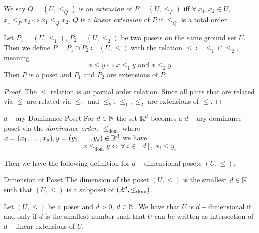 \documentclass[twoside]{article}
\newcommand{\domrel}{\ensuremath{\leq_{\text{dom}}}}
\begin{document}
We say $Q=(U,\leq_Q)$ is an \textit{extension} of $P=(U,\leq_P)$ iff $\forall\ x_1,x_2\in U$, $x_1\leq_Px_2\iff x_1\leq_Qx_2$. $Q$ is a \textit{linear extension} of $P$ if $\leq_Q$ is a total order. 
\begin{lemma}{}{}
	Let $P_1=(U,\leq _1)$, $P_2=(U,\leq_2)$ be two posets on the same ground set $U$. Then we define $P=P_1\cap P_2\coloneqq (U,\leq)$ with the relation $\leq \coloneqq \leq_1\cap \leq_2$, meaning $$x\leq y\iff x\leq_1y\text{ and }x\leq_2y$$Then $P$ is a poset and $P_1$ and $P_2$ are extensions of $P$.
\end{lemma}
\begin{proof}
	The $\leq $ relation is an partial order relation. Since all pairs that are related via $\leq $ are related via $\leq_1$ and $\leq _2$, $\leq_1,\leq_2$ are extensions of $\leq$.
\end{proof}
\begin{Definition}{$d-$ary Dominance Poset}{}
	For $d\in \mathbb{N}$ the set $\mathbb{R}^d$ becomes a $d-$ary dominance poset via the \textit{dominance order}, $\leq_{\text{dom}}$ where $x=(x_1,\dots, x_d), y=(y_1,\dots, y_d)\in \mathbb{R}^d$ we have $$x\domrel y\iff \forall\ i\in[d],\ x_i\leq y_i$$
\end{Definition}
Then we have the following definition for $d-$dimensional posets $(U,\leq)$.
\begin{Definition}{Dimension of Poset}{}
	The dimension of the poset $(U,\leq)$ is the smallest $d\in \mathbb{N}$ such that $(U,\leq)$ is a subposet of  $(\bbR^d,\domrel)$.
\end{Definition}
\begin{Theorem}{}{}
	Let $(U,\leq)$  be a poset and $d>0$, $d\in\mathbb{N}$. We have that $U$ is $d-$dimensional if and only if $d$ is the smallest number such that $U$ can be written as intersection of $d-$linear extensions of $U$. 
\end{Theorem}
\end{document}
